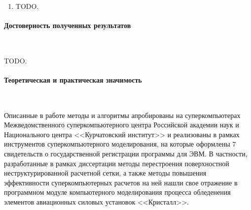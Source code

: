 \documentclass[a4paper,14pt]{extarticle}                     %
\theoremstyle{plain}                                         %
\begin{document}
\

\begin{enumerate}[noitemsep,topsep=0pt,parsep=0pt,partopsep=0pt]
\item TODO.
\end{enumerate}

\paragraph{Достоверность полученных результатов}

\

TODO.

\paragraph{Теоретическая и практическая значимость}

\

Описанные в работе методы и алгоритмы апробированы на суперкомпьютерах Межведомственного суперкомпьютерного центра Российской академии наук и Национального центра <<Курчатовский институт>> и реализованы в рамках инструментов суперкомпьютерного моделирования, на которые оформлены 7 свидетельств о государственной регистрации программы для ЭВМ.
В частности, разработанные в рамках диссертации методы перестроения поверхностной неструктурированной расчетной сетки, а также методы повышения эффективности суперкомпьютерных расчетов на ней нашли свое отражение в программном модуле компьютерного моделирования процесса обледенения элементов авиационных силовых установок <<Кристалл>>.
\end{document}
